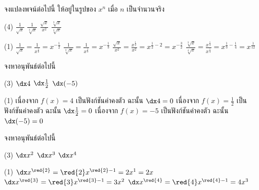 \begin{frame}[t]
\begin{ex}
จงแปลงพจน์ต่อไปนี้ ให้อยู่ในรูปของ $x^n$ เมื่อ $n$ เป็นจำนวนจริง
\begin{tasks}(4)
\task $\frac{1}{\sqrt{x}}$
\task $\frac{1}{\sqrt[3]{x}}$
\task $\frac{\sqrt{x}}{x^2}$
\task $\frac{\sqrt[3]{x}}{\sqrt[4]{x}}$
\end{tasks}
\end{ex}
\begin{sol}
\begin{tasks}(1)
\task $\frac{1}{\sqrt{x}} = \frac{1}{x^{\frac{1}{2}}} = x^{-\frac{1}{2}}$
\task $\frac{1}{\sqrt[3]{x}} = \frac{1}{x^{\frac{1}{3}}} = x^{-\frac{1}{3}}$
\task $\frac{\sqrt{x}}{x^2} = \frac{x^{\frac{1}{2}}}{x^2} = x^{\frac{1}{2} - 2} = x^{-\frac{3}{2}}$
\task $\frac{\sqrt[3]{x}}{\sqrt[4]{x}} = \frac{x^{\frac{1}{3}}}{x^{\frac{1}{4}}} = x^{\frac{1}{3} - \frac{1}{4}} = x^{\frac{1}{12}}$
\end{tasks}
\end{sol}
\end{frame}

\begin{frame}[t]
\begin{ex}
จงหาอนุพันธ์ต่อไปนี้
\begin{tasks}(3)
\task $\dx 4$
\task $\dx \frac{1}{2}$
\task $\dx (-5)$
\end{tasks}
\end{ex}
\begin{sol}
\begin{tasks}(1)
\task เนื่องจาก $f(x) = 4$ เป็นฟังก์ชันค่าคงตัว ฉะนั้น $\dx 4 = 0$
\task เนื่องจาก $f(x) = \frac{1}{2}$ เป็นฟังก์ชันค่าคงตัว ฉะนั้น $\dx \frac{1}{2} = 0$
\task เนื่องจาก $f(x) = -5$ เป็นฟังก์ชันค่าคงตัว ฉะนั้น $\dx (-5) = 0$
\end{tasks}
\end{sol}
\end{frame}


\begin{frame}[t]
\begin{ex}
จงหาอนุพันธ์ต่อไปนี้
\begin{tasks}(3)
\task $\dx x^2$
\task $\dx x^3$
\task $\dx x^4$
\end{tasks}
\end{ex}
\begin{sol}
\begin{tasks}(1)
\task $\dx x^{\red{2}} = \red{2} x^{\red{2}-1} = 2x^1 = 2x$
\task $\dx x^{\red{3}} = \red{3} x^{\red{3}-1} = 3x^2 $
\task $\dx x^{\red{4}} = \red{4} x^{\red{4}-1} = 4x^3$
\end{tasks}
\end{sol}
\end{frame}

